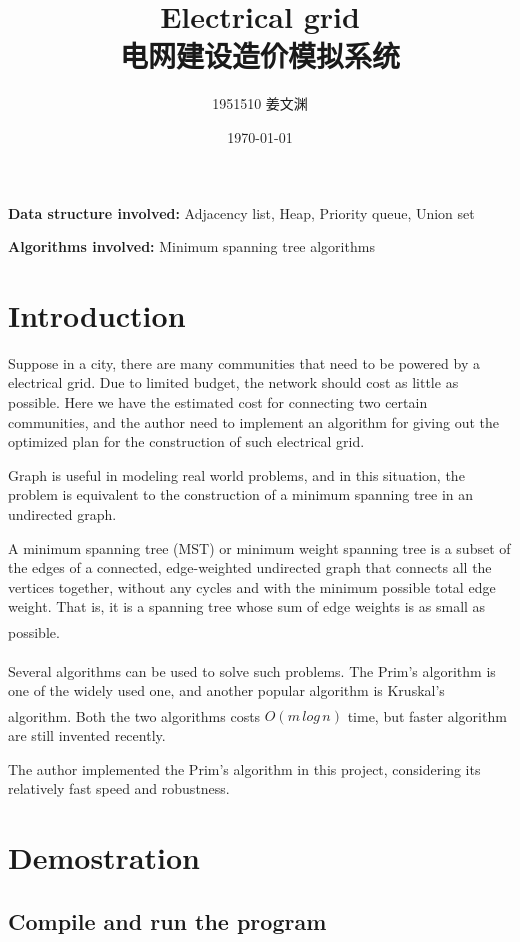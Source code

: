 \documentclass[cn,black,12pt,normal]{elegantnote}
\title{Electrical grid\\电网建设造价模拟系统}
\author{1951510\; 姜文渊}
\institute{\small \url{https://github.com/jwyjohn/Jwy_DataStructureHomework}}
\date{\today}
\newcommand{\uct}[1]{\textsuperscript{\textsuperscript{\cite{#1}}}}
\begin{document}
\maketitle

\textbf{Data structure involved:} Adjacency list, Heap, Priority queue, Union set

\textbf{Algorithms involved:} Minimum spanning tree algorithms

\tableofcontents

\newpage

\section{Introduction}

Suppose in a city, there are many communities that need to be powered by a electrical grid. Due to limited budget, the network should cost as little as possible. Here we have the estimated cost for connecting two certain communities, and the author need to implement an algorithm for giving out the optimized plan for the construction of such electrical grid.

Graph is useful in modeling real world problems, and in this situation, the problem is equivalent to the construction of a minimum spanning tree in an undirected graph.

A minimum spanning tree (MST) or minimum weight spanning tree is a subset of the edges of a connected, edge-weighted undirected graph that connects all the vertices together, without any cycles and with the minimum possible total edge weight. That is, it is a spanning tree whose sum of edge weights is as small as possible.\uct{wiki:Minimum_spanning_tree}

Several algorithms can be used to solve such problems. The Prim's algorithm\uct{cheriton1976finding} is one of the widely used one, and another popular algorithm is Kruskal's algorithm\uct{kruskal1956shortest}. Both the two algorithms costs $O(m\, log\, n)$ time, but faster algorithm are still invented recently.

The author implemented the Prim's algorithm in this project, considering its relatively fast speed and robustness.


\section{Demostration}

\subsection{Compile and run the program}
\end{document}
